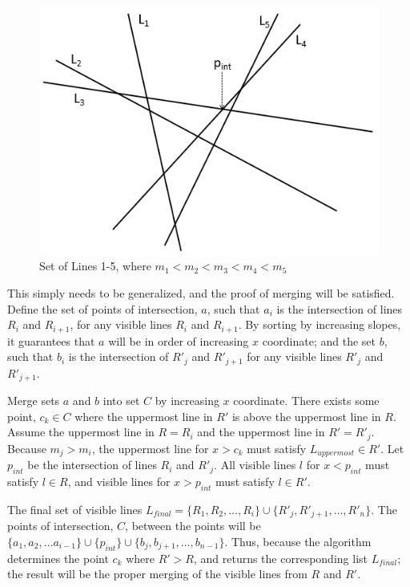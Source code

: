 \documentclass{article}
\begin{document}
\begin{figure}[h!]
	\label{Merge}
	\centering
	\includegraphics[scale=.5]{Images/RecursiveCase.png}
	\caption{Set of Lines 1-5, where $m_1 < m_2 < m_3 <m_4 < m_5$}
\end{figure}

This simply needs to be generalized, and the proof of merging will be satisfied. 
Define the set of points of intersection, $a$, such that $a_i$ is the intersection of lines $R_i$ and $R_{i+1}$, for any visible lines $R_i$ and $R_{i+1}$.
By sorting by increasing slopes, it guarantees that $a$ will be in order of increasing $x$ coordinate; and the set $b$, such that $b_i$ is the intersection of $R'_j$ and $R'_{j+1}$ for any visible lines $R'_j$ and $R'_{j+1}$.

Merge sets $a$ and $b$ into set $C$ by increasing $x$ coordinate.  
There exists some point, $c_k \in C$ where the uppermost line in $R'$ is above the uppermost line in $R$.  Assume the uppermost line in $R = R_i$ and the uppermost line in $R' = R'_j$.  Because $m_j > m_i$, the uppermost line for $x > c_k$ must satisfy $L_{uppermost} \in R'$.  
Let $p_{int}$ be the intersection of lines $R_i$ and $R'_j$.  All visible lines $l$ for $x < p_{int}$ must satisfy $l \in R$, and visible lines for $x > p_{int}$ must satisfy $l \in R'$.

The final set of visible lines $L_{final} = \{R_1, R_2, \dots , R_i \} \cup \{R'_j, R'_{j+1}, \dots , R'_n \}$.
The points of intersection, $C$, between the points will be $\{a_1, a_2, \dots a_{i-1} \} \cup \{p_{int}\} \cup \{b_j, b_{j+1}, \dots , b_{n-1} \}$.
Thus, because the algorithm determines the point $c_k$ where $R' > R$, and returns the corresponding list $L_{final}$; the result will be the proper merging of the visible lines from $R$ and $R'$.
\end{document}
